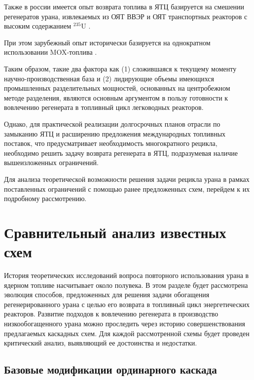 Также в россии имеется опыт возврата топлива в ЯТЦ базируется на смешении регенератов урана, извлекаемых из ОЯТ ВВЭР и ОЯТ транспортных реакторов с высоким содержанием $^{235}$U \cite{international2003iaea}.

При этом зарубежный опыт исторически базируется на однократном использовании MOX-топлива \cite{international2003iaea}.



Таким образом, такие два фактора как (1) сложившаяся к текущему моменту научно-производственная база и (2) лидирующие объемы имеющихся промышленных разделительных мощностей, основанных на центробежном методе разделения, являются основным аргументом в пользу готовности к вовлечению регенерата в топливный цикл легководных реакторов.

Однако, для практической реализации долгосрочных планов отрасли по замыканию ЯТЦ и расширению предложения международных топливных поставок, что предусматривает необходимость многократного рецикла, необходимо решить задачу возврата регенерата в ЯТЦ, подразумевая наличие вышеизложенных ограничений.

Для анализа теоретической возможности решения задачи рецикла урана в рамках поставленных ограничений с помощью ранее предложенных схем, перейдем к их подробному рассмотрению.

\section{Сравнительный анализ известных схем}

История теоретических исследований вопроса повторного использования урана в ядерном топливе насчитывает около полувека.
В этом разделе будет рассмотрена эволюция способов, предложенных для решения задачи обогащения регенерированного урана с целью его возврата в топливный цикл энергетических реакторов.
Развитие подходов к вовлечению регенерата в производство низкообогащенного урана можно проследить через историю совершенствования предлагаемых каскадных схем.
Для каждой рассмотренной схемы будет проведен критический анализ, выявляющий ее достоинства и недостатки.

\subsection{Базовые модификации ординарного каскада}

